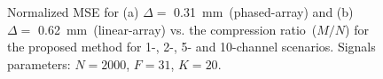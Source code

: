 \documentclass{article}
\theoremstyle{definition}
\begin{document}
\begin{figure}[htb]
	\hfill%
	\hfill%
	\hfill%
	\caption{Normalized MSE for (a) $\Delta = $ \SI{0.31}{\milli\metre}~(phased-array) and (b) $\Delta = $ \SI{0.62}{\milli\metre}~(linear-array) vs. the compression ratio~($M/N$) for the proposed method for \num{1}-, \num{2}-, \num{5}- and \num{10}-channel scenarios. Signals parameters: $N=2000$, $F=31$, $K=20$.}
	\label{fig_synth_US}
\end{figure}
\end{document}
